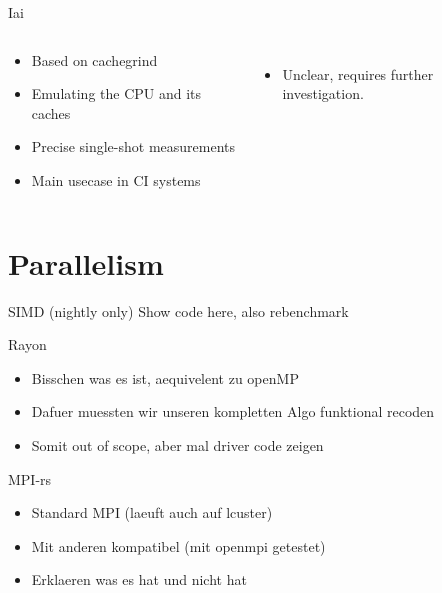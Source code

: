 \documentclass[compress,aspectratio=169]{beamer}
\begin{document}
\begin{frame}{Iai \cite{iai}}
  \begin{columns}
    \begin{column}{0.5\textwidth}
  \begin{itemize}
    \item Based on cachegrind
    \item Emulating the CPU and its caches
    \item Precise single-shot measurements
    \item Main usecase in CI systems
  \end{itemize}
    \end{column}
    \begin{column}{0.5\textwidth}
    \footnotesize\inputminted[xleftmargin=1em,linenos]{text}{../assets/iai.txt}
      \begin{itemize}
        \item Unclear, requires further investigation.
      \end{itemize}
    \end{column}
  \end{columns}
\end{frame}

\section{Parallelism}
\begin{frame}{SIMD (nightly only)}
  Show code here, also rebenchmark
\end{frame}

\begin{frame}{Rayon}
  \begin{itemize}
    \item Bisschen was es ist, aequivelent zu openMP
    \item Dafuer muessten wir unseren kompletten Algo funktional recoden
    \item Somit out of scope, aber mal driver code zeigen
  \end{itemize}
\end{frame}

\begin{frame}{MPI-rs}
  \begin{itemize}
    \item Standard MPI (laeuft auch auf lcuster)
    \item Mit anderen kompatibel (mit openmpi getestet)
    \item Erklaeren was es hat und nicht hat
  \end{itemize}
\end{frame}
\end{document}
